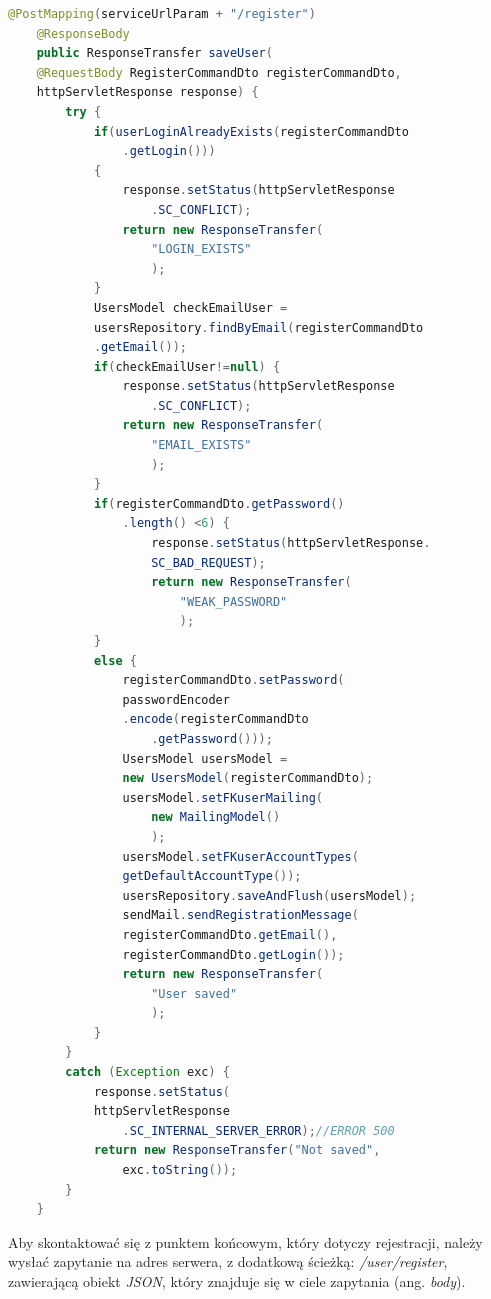 \documentclass[twoside]{projektInzynierskiMS}
\numberwithin{figure}{section}
\begin{document}
\begin{lstlisting}[language=Java,caption=Implementacja projektowa rejestracji nowych użytkowników. Źródło: Opracowanie własne.,captionpos=b]
    @PostMapping(serviceUrlParam + "/register")
    @ResponseBody
    public ResponseTransfer saveUser(
    @RequestBody RegisterCommandDto registerCommandDto, 
    httpServletResponse response) {
        try {
            if(userLoginAlreadyExists(registerCommandDto
                .getLogin()))
            {
                response.setStatus(httpServletResponse
                    .SC_CONFLICT);
                return new ResponseTransfer(
                    "LOGIN_EXISTS"
                    );
            }
            UsersModel checkEmailUser = 
            usersRepository.findByEmail(registerCommandDto
            .getEmail());
            if(checkEmailUser!=null) {
                response.setStatus(httpServletResponse
                    .SC_CONFLICT);
                return new ResponseTransfer(
                    "EMAIL_EXISTS"
                    );
            }
            if(registerCommandDto.getPassword()
                .length() <6) {
                    response.setStatus(httpServletResponse.
                    SC_BAD_REQUEST);
                    return new ResponseTransfer(
                        "WEAK_PASSWORD"
                        );
            }
            else {
                registerCommandDto.setPassword(
                passwordEncoder
                .encode(registerCommandDto
                    .getPassword()));
                UsersModel usersModel =
                new UsersModel(registerCommandDto);
                usersModel.setFKuserMailing(
                    new MailingModel()
                    );
                usersModel.setFKuserAccountTypes(
                getDefaultAccountType());
                usersRepository.saveAndFlush(usersModel);
                sendMail.sendRegistrationMessage(
                registerCommandDto.getEmail(), 
                registerCommandDto.getLogin());
                return new ResponseTransfer(
                    "User saved"
                    );
            }
        }
        catch (Exception exc) {
            response.setStatus(
            httpServletResponse
                .SC_INTERNAL_SERVER_ERROR);//ERROR 500
            return new ResponseTransfer("Not saved", 
                exc.toString());
        }
    }
\end{lstlisting}
Aby skontaktować się z punktem końcowym, który dotyczy rejestracji, należy wysłać zapytanie na adres serwera, z dodatkową ścieżką: \textit{/user/register}, zawierającą obiekt \textit{JSON}, który znajduje się w ciele zapytania (ang. \textit{body}).
\end{document}
